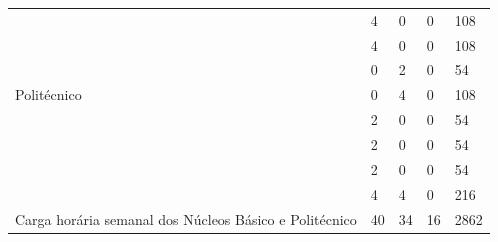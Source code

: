 \documentclass[11pt,fleqn]{book} %
\begin{document}
\begin{table}[H]
{\begin{tabular}{|l|l|l|l|l|l|}
			\multirow{7}{*}{Politécnico}   
			& \nameref{disc:quimica}                                                       & 4          & 0         & 0         & 108       \\ \cline{2-6} 
			& \nameref{disc:biologia}                                                      & 4          & 0         & 0         & 108       \\ \cline{2-6} 	
			& \nameref{disc:bioquimica}                                                    & 0          & 2         & 0         & 54        \\ \cline{2-6} 
			& \nameref{disc:biomol}                                                        & 0          & 4         & 0         & 108       \\ \cline{2-6} 
			& \nameref{disc:bioetica}                                                      & 2          & 0         & 0         & 54        \\ \cline{2-6} 		
			& \nameref{disc:bioseg}                                                        & 2          & 0         & 0         & 54        \\ \cline{2-6} 		
			& \nameref{disc:info}                                                          & 2          & 0         & 0         & 54        \\ \cline{2-6} 
			& \nameref{disc:pratica}                                                       & 4          & 4         & 0         & 216       \\ \hline	
			\multicolumn{2}{|l|}{Carga horária semanal dos Núcleos Básico  e Politécnico}  & 40         & 34        & 16        & 2862      \\ \hline
			

\end{tabular}}
\end{table}
\end{document}
